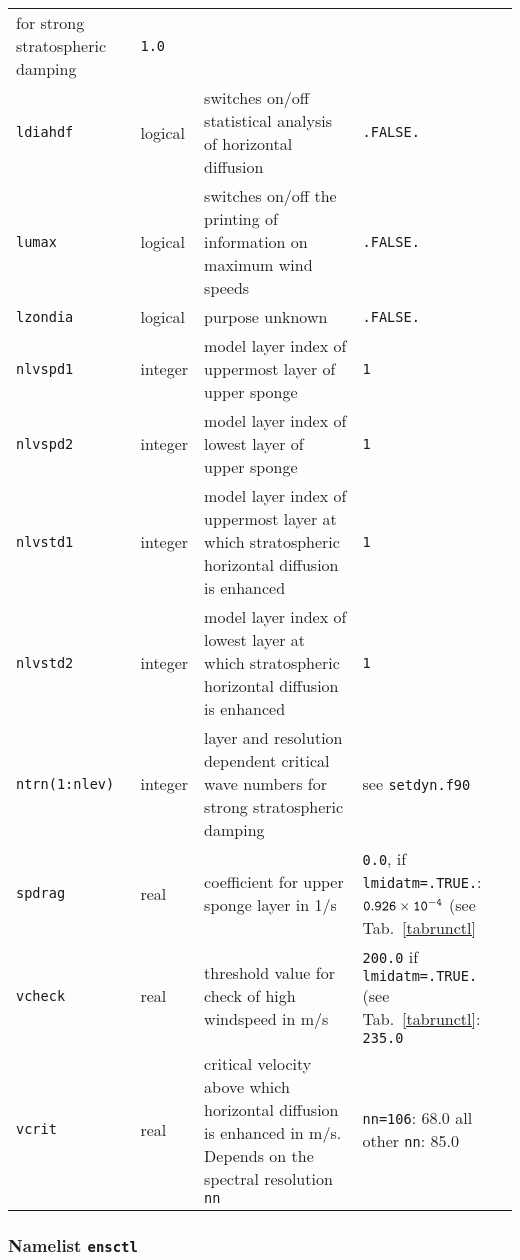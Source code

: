 \begin{longtable}{l@{\extracolsep\fill}lp{5.0cm}p{3.0cm}}
for strong stratospheric 
  damping & {\tt 1.0} \\
{\tt ldiahdf}\index{namelist variables!ldiahdf}
 & logical & switches on/off statistical analysis of
horizontal diffusion & {\tt .FALSE.} \\
{\tt lumax}\index{namelist variables!lumax}
 & logical & switches on/off the printing of information
  on maximum wind speeds & {\tt .FALSE.} \\
{\tt lzondia}\index{namelist variables!lzondia}
 & logical & purpose unknown & {\tt .FALSE.} \\
{\tt nlvspd1}\index{namelist variables!nlvspd1}
 & integer & model layer index of uppermost layer of
  upper sponge & {\tt 1} \\
{\tt nlvspd2}\index{namelist variables!nlvspd2}
 & integer & model layer index of lowest layer of
  upper sponge & {\tt 1} \\
{\tt nlvstd1}\index{namelist variables!nlvstd1}
 & integer & model layer index of uppermost layer at which
  stratospheric horizontal diffusion is enhanced & {\tt 1} \\
{\tt nlvstd2}\index{namelist variables!nlvstd2}
 & integer & model layer index of lowest layer at which
  stratospheric horizontal diffusion is enhanced & {\tt 1} \\
{\tt ntrn(1:nlev)}\index{namelist variables!ntrn}
 & integer & layer and resolution dependent critical
  wave numbers for strong stratospheric damping & see {\tt setdyn.f90}
  \\
{\tt spdrag}\index{namelist variables!spdrag}
 & real & coefficient for upper sponge layer in 1/s
  & {\tt 0.0}, if {\tt lmidatm=.TRUE.}: {$\tt 0.926\times 10^{-4}$} (see
  Tab.~\ref{tabrunctl} \\
{\tt vcheck}\index{namelist variables!vcheck}
 & real & threshold value for check of high
windspeed in m/s & {\tt 200.0} \newline
                   if {\tt lmidatm=.TRUE.} (see Tab.~\ref{tabrunctl}:
                   {\tt 235.0} \\
{\tt vcrit}\index{namelist variables!vcrit}
 & real & critical velocity above which horizontal
  diffusion is enhanced in m/s. Depends on the spectral resolution {\tt
  nn} & {\tt nn=106}: 68.0 \newline
        all other {\tt nn}: 85.0 \\
\hline
\end{longtable}


\subsubsection{Namelist {\tt ensctl}}\label{secensctl}

